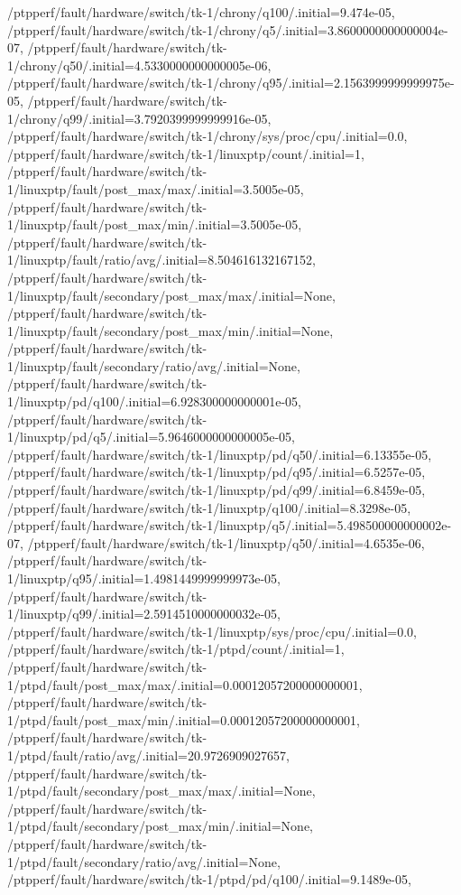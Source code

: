 {    /ptpperf/fault/hardware/switch/tk-1/chrony/q100/.initial=9.474e-05,
    /ptpperf/fault/hardware/switch/tk-1/chrony/q5/.initial=3.8600000000000004e-07,
    /ptpperf/fault/hardware/switch/tk-1/chrony/q50/.initial=4.5330000000000005e-06,
    /ptpperf/fault/hardware/switch/tk-1/chrony/q95/.initial=2.1563999999999975e-05,
    /ptpperf/fault/hardware/switch/tk-1/chrony/q99/.initial=3.7920399999999916e-05,
    /ptpperf/fault/hardware/switch/tk-1/chrony/sys/proc/cpu/.initial=0.0,
    /ptpperf/fault/hardware/switch/tk-1/linuxptp/count/.initial=1,
    /ptpperf/fault/hardware/switch/tk-1/linuxptp/fault/post_max/max/.initial=3.5005e-05,
    /ptpperf/fault/hardware/switch/tk-1/linuxptp/fault/post_max/min/.initial=3.5005e-05,
    /ptpperf/fault/hardware/switch/tk-1/linuxptp/fault/ratio/avg/.initial=8.504616132167152,
    /ptpperf/fault/hardware/switch/tk-1/linuxptp/fault/secondary/post_max/max/.initial=None,
    /ptpperf/fault/hardware/switch/tk-1/linuxptp/fault/secondary/post_max/min/.initial=None,
    /ptpperf/fault/hardware/switch/tk-1/linuxptp/fault/secondary/ratio/avg/.initial=None,
    /ptpperf/fault/hardware/switch/tk-1/linuxptp/pd/q100/.initial=6.928300000000001e-05,
    /ptpperf/fault/hardware/switch/tk-1/linuxptp/pd/q5/.initial=5.9646000000000005e-05,
    /ptpperf/fault/hardware/switch/tk-1/linuxptp/pd/q50/.initial=6.13355e-05,
    /ptpperf/fault/hardware/switch/tk-1/linuxptp/pd/q95/.initial=6.5257e-05,
    /ptpperf/fault/hardware/switch/tk-1/linuxptp/pd/q99/.initial=6.8459e-05,
    /ptpperf/fault/hardware/switch/tk-1/linuxptp/q100/.initial=8.3298e-05,
    /ptpperf/fault/hardware/switch/tk-1/linuxptp/q5/.initial=5.498500000000002e-07,
    /ptpperf/fault/hardware/switch/tk-1/linuxptp/q50/.initial=4.6535e-06,
    /ptpperf/fault/hardware/switch/tk-1/linuxptp/q95/.initial=1.4981449999999973e-05,
    /ptpperf/fault/hardware/switch/tk-1/linuxptp/q99/.initial=2.5914510000000032e-05,
    /ptpperf/fault/hardware/switch/tk-1/linuxptp/sys/proc/cpu/.initial=0.0,
    /ptpperf/fault/hardware/switch/tk-1/ptpd/count/.initial=1,
    /ptpperf/fault/hardware/switch/tk-1/ptpd/fault/post_max/max/.initial=0.00012057200000000001,
    /ptpperf/fault/hardware/switch/tk-1/ptpd/fault/post_max/min/.initial=0.00012057200000000001,
    /ptpperf/fault/hardware/switch/tk-1/ptpd/fault/ratio/avg/.initial=20.9726909027657,
    /ptpperf/fault/hardware/switch/tk-1/ptpd/fault/secondary/post_max/max/.initial=None,
    /ptpperf/fault/hardware/switch/tk-1/ptpd/fault/secondary/post_max/min/.initial=None,
    /ptpperf/fault/hardware/switch/tk-1/ptpd/fault/secondary/ratio/avg/.initial=None,
    /ptpperf/fault/hardware/switch/tk-1/ptpd/pd/q100/.initial=9.1489e-05,
}
